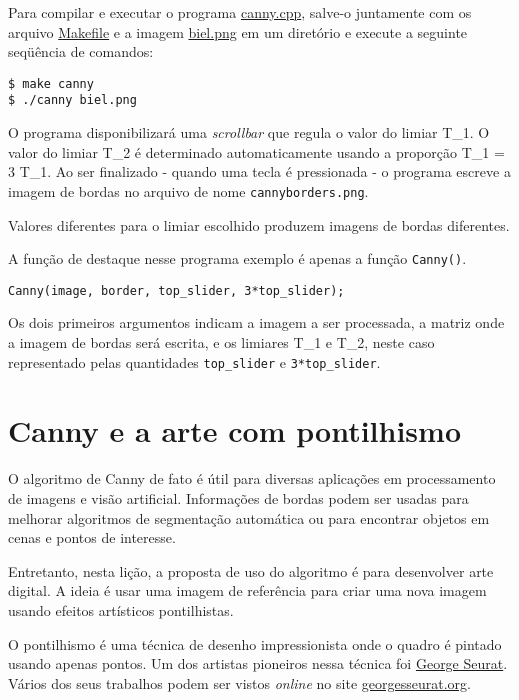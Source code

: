 \documentclass[11pt]{amsbook}
\begin{document}
Para compilar e executar o programa
\href{exemplos/canny.cpp}{canny.cpp}, salve-o juntamente com os arquivo
\href{exemplos/Makefile}{Makefile} e a imagem
\href{figs/biel.png}{biel.png} em um diretório e execute a seguinte
seqüência de comandos:


\begin{verbatim}
$ make canny
$ ./canny biel.png
\end{verbatim}

O programa disponibilizará uma \emph{scrollbar} que regula o valor do
limiar T_1. O valor do limiar T_2 é
determinado automaticamente usando a proporção T_1 = 3
T_1. Ao ser finalizado - quando uma tecla é pressionada - o programa
escreve a imagem de bordas no arquivo de nome \texttt{cannyborders.png}.


Valores diferentes para o limiar escolhido produzem imagens de bordas
diferentes.


A função de destaque nesse programa exemplo é apenas a função
\texttt{Canny()}.


\begin{verbatim}
Canny(image, border, top_slider, 3*top_slider);
\end{verbatim}

Os dois primeiros argumentos indicam a imagem a ser processada, a
matriz onde a imagem de bordas será escrita, e os limiares
T_1 e T_2, neste caso representado pelas
quantidades  \texttt{top_slider} e \texttt{3*top_slider}.


\hypertarget{x-canny-e-a-arte-com-pontilhismo}{\chapter{Canny e a arte com pontilhismo}}
O algoritmo de Canny de fato é útil para diversas aplicações em
processamento de imagens e visão artificial. Informações de bordas
podem ser usadas para melhorar algoritmos de segmentação automática ou
para encontrar objetos em cenas e pontos de interesse.


Entretanto, nesta lição, a proposta de uso do algoritmo é para
desenvolver arte digital. A ideia é usar uma imagem de referência para
criar uma nova imagem usando efeitos artísticos pontilhistas.


O pontilhismo é uma técnica de desenho impressionista onde o quadro é
pintado usando apenas pontos. Um dos artistas pioneiros nessa técnica
foi \href{https://en.wikipedia.org/wiki/Georges_Seurat}{George
Seurat}. Vários dos seus trabalhos podem ser vistos \emph{online} no site
\href{http://www.georgesseurat.org/}{georgesseurat.org}.
\end{document}
